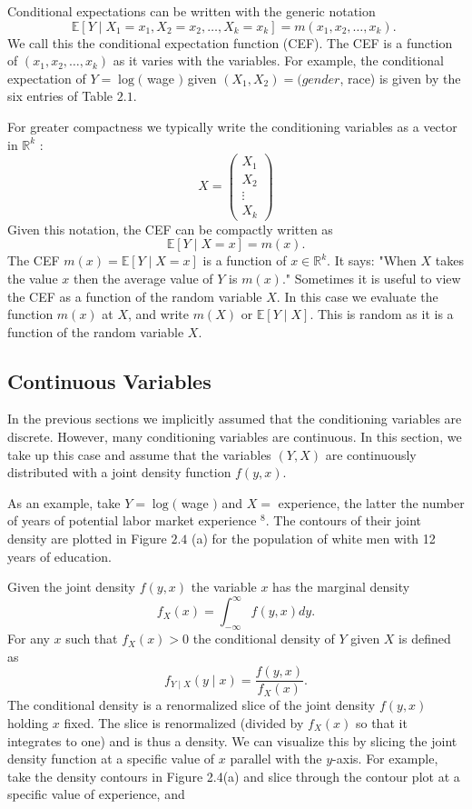 \documentclass[10pt]{article}
\begin{document}
Conditional expectations can be written with the generic notation
$$
\mathbb{E}\left[Y \mid X_{1}=x_{1}, X_{2}=x_{2}, \ldots, X_{k}=x_{k}\right]=m\left(x_{1}, x_{2}, \ldots, x_{k}\right) \text {. }
$$
We call this the conditional expectation function (CEF). The CEF is a function of $\left(x_{1}, x_{2}, \ldots, x_{k}\right)$ as it varies with the variables. For example, the conditional expectation of $Y=\log ($ wage $)$ given $\left(X_{1}, X_{2}\right)=(g e n d e r$, race) is given by the six entries of Table $2.1 .$

For greater compactness we typically write the conditioning variables as a vector in $\mathbb{R}^{k}$ :
$$
X=\left(\begin{array}{c}
X_{1} \\
X_{2} \\
\vdots \\
X_{k}
\end{array}\right)
$$
Given this notation, the CEF can be compactly written as
$$
\mathbb{E}[Y \mid X=x]=m(x) .
$$
The CEF $m(x)=\mathbb{E}[Y \mid X=x]$ is a function of $x \in \mathbb{R}^{k}$. It says: "When $X$ takes the value $x$ then the average value of $Y$ is $m(x)$." Sometimes it is useful to view the CEF as a function of the random variable $X$. In this case we evaluate the function $m(x)$ at $X$, and write $m(X)$ or $\mathbb{E}[Y \mid X]$. This is random as it is a function of the random variable $X$.

\subsection{Continuous Variables}
In the previous sections we implicitly assumed that the conditioning variables are discrete. However, many conditioning variables are continuous. In this section, we take up this case and assume that the variables $(Y, X)$ are continuously distributed with a joint density function $f(y, x)$.

As an example, take $Y=\log ($ wage $)$ and $X=$ experience, the latter the number of years of potential labor market experience ${ }^{8}$. The contours of their joint density are plotted in Figure $2.4$ (a) for the population of white men with 12 years of education.

Given the joint density $f(y, x)$ the variable $x$ has the marginal density
$$
f_{X}(x)=\int_{-\infty}^{\infty} f(y, x) d y .
$$
For any $x$ such that $f_{X}(x)>0$ the conditional density of $Y$ given $X$ is defined as
$$
f_{Y \mid X}(y \mid x)=\frac{f(y, x)}{f_{X}(x)} .
$$
The conditional density is a renormalized slice of the joint density $f(y, x)$ holding $x$ fixed. The slice is renormalized (divided by $f_{X}(x)$ so that it integrates to one) and is thus a density. We can visualize this by slicing the joint density function at a specific value of $x$ parallel with the $y$-axis. For example, take the density contours in Figure 2.4(a) and slice through the contour plot at a specific value of experience, and
\end{document}
